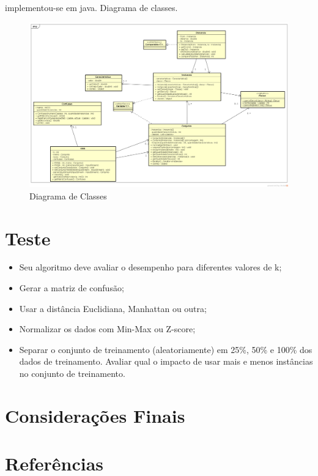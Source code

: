 \documentclass[12pt]{article}
\begin{document}
		implementou-se em java.
		Diagrama de classes.

		\begin{landscape}
		\centering
		\begin{figure}[p]
		\includegraphics[width=1.4\textwidth]{classDiagram.png}
		\caption{Diagrama de Classes}
		\label{fig:classDiagram}
		\end{figure}
		\end{landscape}
		\restoregeometry

	\section{Teste}\label{sec:testes}

		\begin{itemize}
			\item Seu algoritmo deve avaliar o desempenho para diferentes valores de k;
			\item Gerar a matriz de confusão;
			\item Usar a distância Euclidiana, Manhattan ou outra;
			\item Normalizar os dados com Min-Max ou Z-score;
			\item Separar o conjunto de treinamento (aleatoriamente) em 25\%, 50\% e 100\% dos dados de treinamento. Avaliar qual o impacto de usar mais e menos instâncias no conjunto de treinamento.
		\end{itemize}


	\section{Considerações Finais}\label{sec:consideracoesFinais}

		

	\section{Referências}\label{sec:referencias}

		
\end{document}
